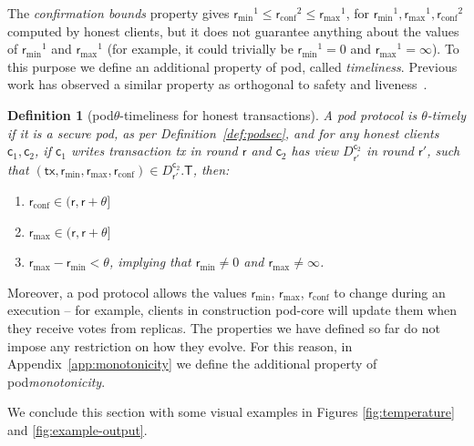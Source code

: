 \documentclass[pdflatex,sn-mathphys-num]{sn-jnl}%
\theoremstyle{thmstyleone}%
\theoremstyle{thmstyletwo}%
\theoremstyle{thmstylethree}%
\newtheorem{definition}{Definition}%
\newcommand{\podtm}{\textsf{pod}\xspace}
\newcommand{\operand}[1]{\textsf{#1}}
\newcommand{\tx}{\operand{tx}\xspace}
\newcommand{\round}{\operand{r}\xspace}
\newcommand{\client}{\operand{c}\xspace}
\newcommand{\rconf}{\ensuremath{\round_\text{conf}}\xspace}
\newcommand{\rmin}{\ensuremath{\round_\text{min}}\xspace}
\newcommand{\rmax}{\ensuremath{\round_\text{max}}\xspace}
\newcommand{\txSet}{\operand{T}\xspace}
\newcommand{\parConf}{\ensuremath{u}\xspace}
\newcommand{\parTemp}{\ensuremath{\theta}\xspace}
\newcommand{\Pod}{\ensuremath{D}\xspace}
\newcommand{\podView}[2]{\ensuremath{\Pod_{#2}^{#1}}\xspace}
\begin{document}
The \emph{confirmation bounds} property gives $\rmin^1 \leq \rconf^2 \leq \rmax^1$, for $\rmin^1, \rmax^1, \rconf^2$ computed by honest clients, but it does not guarantee anything about the values of $\rmin^1$ and $\rmax^1$ (for example, it could trivially be $\rmin^1=0$ and $\rmax^1=\infty$).
To this purpose we define an additional property of \podtm, called \emph{timeliness}.
Previous work has observed a similar property as orthogonal to safety and liveness~\cite{EPRINT:TziSriZin23}.

\begin{definition}[\podtm \parTemp-timeliness for honest transactions]\label{def:pod-timely}
    A \podtm protocol is \emph{\parTemp-timely} if it is a secure \podtm, as per Definition~\ref{def:podsec}, and for any honest clients $\client_1,\client_2$, if $\client_1$ writes transaction \tx in round $\round$ and $\client_2$ has view $\podView{\client_2}{\round'}$ in round $\round'$, such that $(\tx, \rmin, \rmax, \rconf) \in \podView{\client_2}{\round'}.\txSet$, then:
    \begin{enumerate}
        \item $\rconf \in (\round, \round + \parTemp]$
        \item $\rmax \in (\round, \round + \parTemp]$
        \item $\rmax - \rmin < \parTemp$, implying that $\rmin \neq 0$ and $\rmax \neq \infty$.
    \end{enumerate}
\end{definition}


Moreover, a \podtm protocol allows the values \rmin, \rmax, \rconf to change during an execution -- for example, clients in construction \podtm-core will update them when they receive votes from replicas.
The properties we have defined so far do not impose any restriction on how they evolve.
For this reason, in Appendix~\ref{app:monotonicity} we define the additional property of \podtm \emph{monotonicity}.

We conclude this section with some visual examples in Figures \ref{fig:temperature} and \ref{fig:example-output}.
\end{document}
